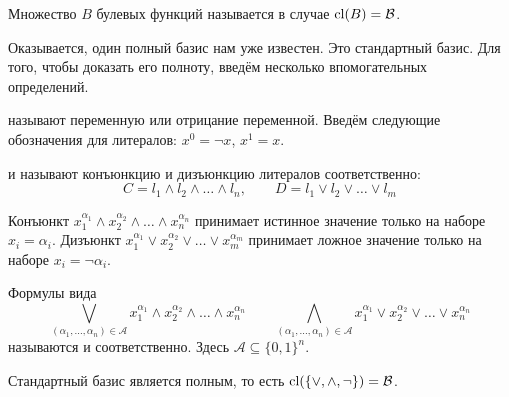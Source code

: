 \begin{definition}
    \label{definition:boolean:complete_class}
    Множество $ B $ булевых функций называется  в случае $ \operatorname*{\textnormal{cl}} (B) = \mathcal{B} $.
\end{definition}


Оказывается, один полный базис нам уже известен.
Это стандартный базис.
Для того, чтобы доказать его полноту, введём несколько впомогательных определений.

\begin{definition}
    \label{definition:boolean:literal}
     называют переменную или отрицание переменной.
    Введём следующие обозначения для литералов: $ x^0 = \neg x $, $ x^1 = x $.
\end{definition}

\begin{definition}
    \label{definition:boolean:clause}
     и  называют конъюнкцию и дизъюнкцию литералов соответственно:
    \[
        C = l_1 \wedge l_2 \wedge \ldots \wedge l_n, \qquad D = l_1 \vee l_2 \vee \ldots \vee l_m
    \]
\end{definition}


\begin{remark}
    \label{remark:boolean:clause_true_false}
    Конъюнкт $ x_1^{\alpha_1} \wedge x_2^{\alpha_2} \wedge \ldots \wedge x_n^{\alpha_n} $ принимает истинное значение только на наборе $ x_i = \alpha_i $.
    Дизъюнкт $ x_1^{\alpha_1} \vee x_2^{\alpha_2} \vee \ldots \vee x_m^{\alpha_m} $ принимает ложное значение только на наборе $ x_i = \neg \alpha_i $.
\end{remark}


\begin{definition}
    \label{definition:DNF_CNF}
    Формулы вида
    \[
        \bigvee_{(\alpha_1, \ldots, \alpha_n) \in \mathcal{A}} x_1^{\alpha_1} \wedge x_2^{\alpha_2} \wedge \ldots \wedge x_n^{\alpha_n}
        \qquad
        \bigwedge_{(\alpha_1, \ldots, \alpha_n) \in \mathcal{A}} x_1^{\alpha_1} \vee x_2^{\alpha_2} \vee \ldots \vee x_n^{\alpha_n}
    \]
    называются  и  соответственно.
    Здесь $ \mathcal{A} \subseteq \{0, 1\}^n $.
\end{definition}


\begin{theorem}
    \label{theorem:boolean:standard_basis_complete}
    Стандартный базис является полным, то есть $ \operatorname*{\textnormal{cl}}(\{\vee, \wedge, \neg\}) = \mathcal{B} $.
\end{theorem}


